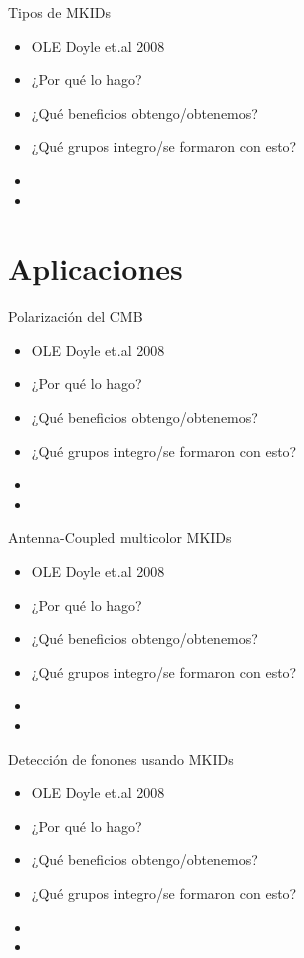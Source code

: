 \documentclass[ignorenonframetext,12pt]{beamer}
\begin{document}
\begin{frame}{Tipos de MKIDs}
				\begin{itemize}
								\item OLE Doyle et.al 2008
								\item ¿Por qué lo hago?
								\item ¿Qué beneficios obtengo/obtenemos?
								\item ¿Qué grupos integro/se formaron con esto?
								\item 
								\item 
				\end{itemize}

\end{frame}

\section{Aplicaciones}
\begin{frame}{Polarización del CMB}
				\begin{itemize}
								\item OLE Doyle et.al 2008
								\item ¿Por qué lo hago?
								\item ¿Qué beneficios obtengo/obtenemos?
								\item ¿Qué grupos integro/se formaron con esto?
								\item 
								\item 
				\end{itemize}

\end{frame}

\begin{frame}{Antenna-Coupled multicolor MKIDs}
				\begin{itemize}
								\item OLE Doyle et.al 2008
								\item ¿Por qué lo hago?
								\item ¿Qué beneficios obtengo/obtenemos?
								\item ¿Qué grupos integro/se formaron con esto?
								\item 
								\item 
				\end{itemize}

\end{frame}

\begin{frame}{Detección de fonones usando MKIDs}
				\begin{itemize}
								\item OLE Doyle et.al 2008
								\item ¿Por qué lo hago?
								\item ¿Qué beneficios obtengo/obtenemos?
								\item ¿Qué grupos integro/se formaron con esto?
								\item 
								\item 
				\end{itemize}

\end{frame}
\end{document}
